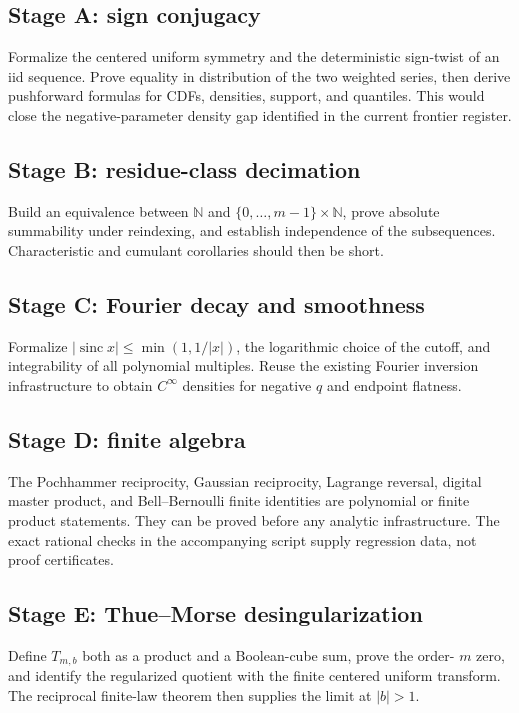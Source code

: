 \documentclass[11pt,oneside]{article}
\theoremstyle{definition}
\theoremstyle{remark}
\newcommand{\N}{\mathbb N}
\newcommand{\sinc}{\operatorname{sinc}}
\begin{document}
\subsection{Stage A: sign conjugacy}
Formalize the centered uniform symmetry and the deterministic sign-twist of an
iid sequence.  Prove equality in distribution of the two weighted series, then
derive pushforward formulas for CDFs, densities, support, and quantiles.  This
would close the negative-parameter density gap identified in the current
frontier register.

\subsection{Stage B: residue-class decimation}
Build an equivalence between \(\N\) and \(\{0,\ldots,m-1\}\times\N\), prove
absolute summability under reindexing, and establish independence of the
subsequences.  Characteristic and cumulant corollaries should then be short.

\subsection{Stage C: Fourier decay and smoothness}
Formalize \(|\sinc x|\le\min(1,1/|x|)\), the logarithmic choice of the cutoff,
and integrability of all polynomial multiples.  Reuse the existing Fourier
inversion infrastructure to obtain \(C^\infty\) densities for negative \(q\)
and endpoint flatness.

\subsection{Stage D: finite algebra}
The Pochhammer reciprocity, Gaussian reciprocity, Lagrange reversal, digital
master product, and Bell--Bernoulli finite identities are polynomial or finite
product statements.  They can be proved before any analytic infrastructure.
The exact rational checks in the accompanying script supply regression data,
not proof certificates.

\subsection{Stage E: Thue--Morse desingularization}
Define \(T_{m,b}\) both as a product and a Boolean-cube sum, prove the order-
\(m\) zero, and identify the regularized quotient with the finite centered
uniform transform.  The reciprocal finite-law theorem then supplies the limit
at \(|b|>1\).
\end{document}

